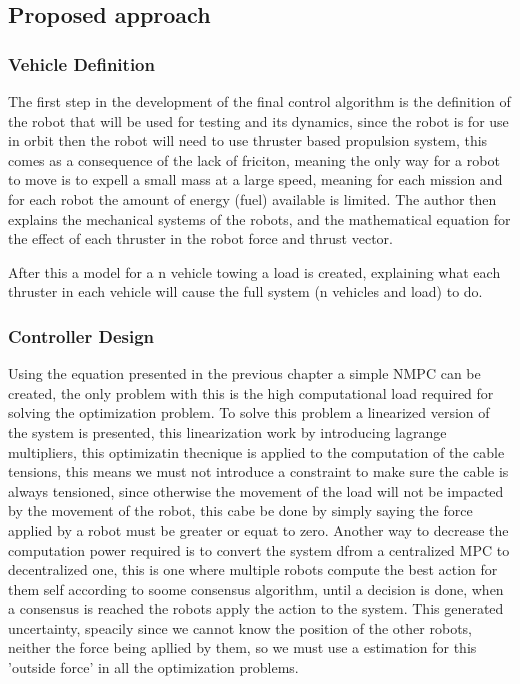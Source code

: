 \documentclass[a4paper,12pt]{article}
\begin{document}
\subsection{Proposed approach}
\subsubsection{Vehicle Definition}
The first step in the development of the final control algorithm is the definition of the robot that will be used for testing and its dynamics, since the robot is for use in orbit then the robot will need to use thruster based propulsion system, this comes as a consequence of the lack of friciton, meaning the only way for a robot to move is to expell a small mass at a large speed, meaning for each mission and for each robot the amount of energy (fuel) available is limited. The author then explains the mechanical systems of the robots, and the mathematical equation for the effect of each thruster in the robot force and thrust vector. 

After this a model for a n vehicle towing a load is created, explaining what each thruster in each vehicle will cause the full system (n vehicles and load) to do.

\subsubsection{Controller Design}
Using the equation presented in the previous chapter a simple NMPC can be created, the only problem with this is the high computational load required for solving the optimization problem. To solve this problem a linearized version of the system is presented, this linearization work by introducing lagrange multipliers, this optimizatin thecnique is applied to the computation of the cable tensions, this means we must not introduce a constraint to make sure the cable is always tensioned, since otherwise the movement of the load will not be impacted by the movement of the robot, this cabe be done by simply saying the force applied by a robot must be greater or equat to zero. Another way to decrease the computation power required is to convert the system dfrom a centralized MPC to decentralized one, this is one where multiple robots compute the best action for them self according to soome consensus algorithm, until a decision is done, when a consensus is reached the robots apply the action to the system. This generated uncertainty, speacily since we cannot know the position of the other robots, neither the force being apllied by them, so we must use a estimation for this 'outside force' in all the optimization problems.
\end{document}
